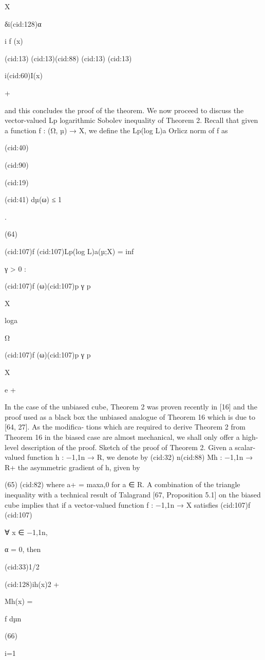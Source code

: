 {X

δi(cid:128)α

i f (x)

(cid:13)
(cid:13)(cid:88)
(cid:13)
(cid:13)

i(cid:60)I(x)

+

and this concludes the proof of the theorem.
We now proceed to discuss the vector-valued Lp logarithmic Sobolev inequality of Theorem
2. Recall that given a function f : (Ω, µ) → X, we deﬁne the Lp(log L)a Orlicz norm of f as

(cid:40)

(cid:90)

(cid:19)

(cid:41)
dµ(ω) ≤ 1

.

(64)

(cid:107)f (cid:107)Lp(log L)a(µ;X) = inf

γ > 0 :

(cid:107)f (ω)(cid:107)p
γ p

X

loga

Ω

(cid:107)f (ω)(cid:107)p
γ p

X

e +

In the case of the unbiased cube, Theorem 2 was proven recently in [16] and the proof used as
a black box the unbiased analogue of Theorem 16 which is due to [64, 27]. As the modiﬁca-
tions which are required to derive Theorem 2 from Theorem 16 in the biased case are almost
mechanical, we shall only oﬀer a high-level description of the proof.
Sketch of the proof of Theorem 2. Given a scalar-valued function h : {−1,1}n → R, we denote by
(cid:32) n(cid:88)
Mh : {−1,1}n → R+ the asymmetric gradient of h, given by

(65)
(cid:82)
where a+ = max{a,0} for a ∈ R. A combination of the triangle inequality with a technical result
of Talagrand [67, Proposition 5.1] on the biased cube implies that if a vector-valued function
f : {−1,1}n → X satisﬁes
(cid:107)f (cid:107)

∀ x ∈ {−1,1}n,

α = 0, then

(cid:33)1/2

(cid:128)ih(x)2
+

Mh(x) =

f dµn

(66)

i=1

}
